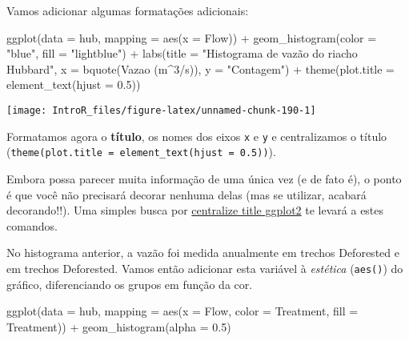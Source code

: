 \documentclass[
]{book}
\newenvironment{Shaded}{\begin{snugshade}}{\end{snugshade}}
\newcommand{\AttributeTok}[1]{\textcolor[rgb]{0.77,0.63,0.00}{#1}}
\newcommand{\DecValTok}[1]{\textcolor[rgb]{0.00,0.00,0.81}{#1}}
\newcommand{\FloatTok}[1]{\textcolor[rgb]{0.00,0.00,0.81}{#1}}
\newcommand{\FunctionTok}[1]{\textcolor[rgb]{0.00,0.00,0.00}{#1}}
\newcommand{\NormalTok}[1]{#1}
\newcommand{\SpecialCharTok}[1]{\textcolor[rgb]{0.00,0.00,0.00}{#1}}
\newcommand{\StringTok}[1]{\textcolor[rgb]{0.31,0.60,0.02}{#1}}
\begin{document}
Vamos adicionar algumas formatações adicionais:

\begin{Shaded}
\begin{Highlighting}[]
\FunctionTok{ggplot}\NormalTok{(}\AttributeTok{data =}\NormalTok{ hub, }\AttributeTok{mapping =} \FunctionTok{aes}\NormalTok{(}\AttributeTok{x =}\NormalTok{ Flow)) }\SpecialCharTok{+}
  \FunctionTok{geom\_histogram}\NormalTok{(}\AttributeTok{color =} \StringTok{"blue"}\NormalTok{, }\AttributeTok{fill =} \StringTok{"lightblue"}\NormalTok{) }\SpecialCharTok{+}
  \FunctionTok{labs}\NormalTok{(}\AttributeTok{title =} \StringTok{"Histograma de vazão do riacho Hubbard"}\NormalTok{, }
       \AttributeTok{x =} \FunctionTok{bquote}\NormalTok{(}\FunctionTok{Vazao}\NormalTok{ (m}\SpecialCharTok{\^{}}\DecValTok{3}\SpecialCharTok{/}\NormalTok{s)),}
       \AttributeTok{y =} \StringTok{"Contagem"}\NormalTok{) }\SpecialCharTok{+}
  \FunctionTok{theme}\NormalTok{(}\AttributeTok{plot.title =} \FunctionTok{element\_text}\NormalTok{(}\AttributeTok{hjust =} \FloatTok{0.5}\NormalTok{))}
\end{Highlighting}
\end{Shaded}

\begin{center}\texttt{[image: IntroR\_files/figure-latex/unnamed-chunk-190-1]} \end{center}

Formatamos agora o \textbf{título}, os nomes dos eixos \texttt{x} e \texttt{y} e centralizamos o título (\texttt{theme(plot.title\ =\ element\_text(hjust\ =\ 0.5))}).

Embora possa parecer muita informação de uma única vez (e de fato é), o ponto é que você não precisará decorar nenhuma delas (mas se utilizar, acabará decorando!!). Uma simples busca por \href{https://www.google.com/search?sxsrf=ALeKk02h6lituhooE6EgHAVc2zcLsOWdLQ\%3A1594404890952\&ei=GrAIX5LrOciv5OUPnfGPsA0\&q=centralize+title+ggplot2\&oq=centralize+title+ggplot2\&gs_lcp=CgZwc3ktYWIQAzIECCMQJzoECAAQRzoHCCMQsAIQJ1CNDFjSPGDfRGgAcAF4AIABlgGIAfkIkgEDMC45mAEAoAEBqgEHZ3dzLXdpeg\&sclient=psy-ab\&ved=0ahUKEwiS4JyJpcPqAhXIF7kGHZ34A9YQ4dUDCAw\&uact=5}{centralize title ggplot2} te levará a estes comandos.

No histograma anterior, a vazão foi medida anualmente em trechos Deforested e em trechos Deforested. Vamos então adicionar esta variável à \emph{estética} (\texttt{aes()}) do gráfico, diferenciando os grupos em função da cor.

\begin{Shaded}
\begin{Highlighting}[]
\FunctionTok{ggplot}\NormalTok{(}\AttributeTok{data =}\NormalTok{ hub, }\AttributeTok{mapping =} \FunctionTok{aes}\NormalTok{(}\AttributeTok{x =}\NormalTok{ Flow, }\AttributeTok{color =}\NormalTok{ Treatment, }\AttributeTok{fill =}\NormalTok{ Treatment)) }\SpecialCharTok{+}
  \FunctionTok{geom\_histogram}\NormalTok{(}\AttributeTok{alpha =} \FloatTok{0.5}\NormalTok{)}
\end{Highlighting}
\end{Shaded}
\end{document}
